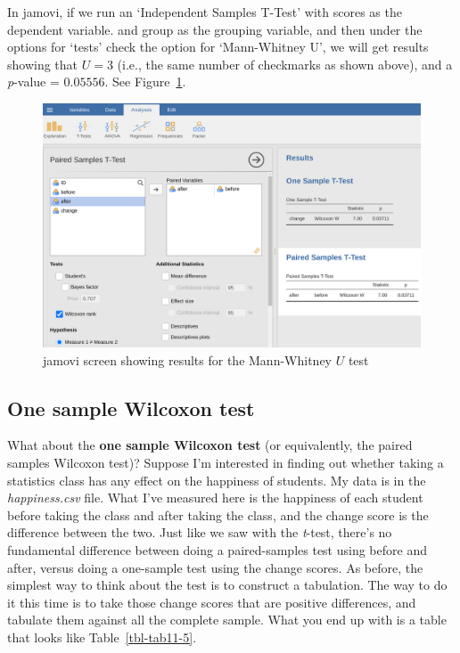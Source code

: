 \documentclass[
  a4paper,
]{book}
\begin{document}
In jamovi, if we run an `Independent Samples T-Test' with scores as the
dependent variable. and group as the grouping variable, and then under
the options for `tests' check the option for `Mann-Whitney U', we will
get results showing that \(U = 3\) (i.e., the same number of checkmarks
as shown above), and a \emph{p}-value = \(0.05556\). See
Figure~\ref{fig-fig11-26}.

\begin{figure}

\includegraphics[width=1\textwidth,height=\textheight]{images/fig11-26.png} \hfill{}

\caption{\label{fig-fig11-26}jamovi screen showing results for the
Mann-Whitney \(U\) test}

\end{figure}

\hypertarget{one-sample-wilcoxon-test}{%
\subsection{One sample Wilcoxon test}\label{one-sample-wilcoxon-test}}

What about the \textbf{one sample Wilcoxon test} (or equivalently, the
paired samples Wilcoxon test)? Suppose I'm interested in finding out
whether taking a statistics class has any effect on the happiness of
students. My data is in the \emph{happiness.csv} file. What I've
measured here is the happiness of each student before taking the class
and after taking the class, and the change score is the difference
between the two. Just like we saw with the \emph{t}-test, there's no
fundamental difference between doing a paired-samples test using before
and after, versus doing a one-sample test using the change scores. As
before, the simplest way to think about the test is to construct a
tabulation. The way to do it this time is to take those change scores
that are positive differences, and tabulate them against all the
complete sample. What you end up with is a table that looks like
Table~\ref{tbl-tab11-5}.
\end{document}
